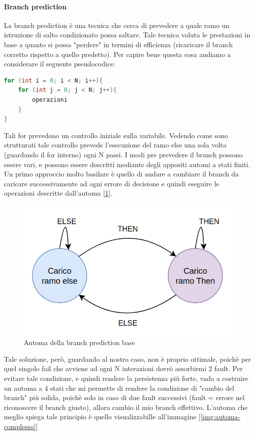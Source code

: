 \paragraph{Branch prediction}
La branch prediction è una tecnica che cerca di prevedere a quale ramo un istruzione di salto condizionato possa saltare. Tale tecnica valuta le prestazioni in base a quanto si possa "perdere" in termini di efficienza (ricaricare il branch corretto rispetto a quello predetto).
Per capire bene questa cosa andiamo a considerare il seguente pseudocodice:
\begin{lstlisting}[language=C]
for (int i = 0; i < N; i++){
    for (int j = 0; j < N; j++){
        operazioni
    }
}
\end{lstlisting}

Tali for prevedono un controllo iniziale sulla variabile. Vedendo come sono strutturati tale controllo prevede l'esecuzione del ramo else una sola volta (guardando il for interno) ogni N passi.
I modi pre prevedere il branch possono essere vari, e possono essere descritti mediante degli appositi automi a stati finiti. Un primo approccio molto basilare è quello di andare a cambiare il branch da caricare successivamente ad ogni errore di decisione e quindi eseguire le operazioni descritte dall'automa [\ref{img:automa-semplice}].

\begin{figure}[ht]
    \centering
    \includegraphics[width=.5\textwidth]{img/automa-semplice.png}
    \caption{Automa della branch prediction base}\label{img:automa-semplice}
\end{figure}

Tale soluzione, però, guardando al nostro caso, non è proprio ottimale, poichè per quel singolo fail che avviene ad ogni N interazioni dovrò assorbirmi 2 fault. Per evitare tale condizione, e quindi rendere la persistenza più forte, vado a costruire un automa a 4 stati che mi permette di rendere la condizione di "cambio del branch" più solida, poichè solo in caso di due fault successivi (fault = errore nel riconoscere il branch giusto), allora cambio il mio branch effettivo. L'automa che meglio spiega tale principio è quello visualizzabille all'immagine [\ref{img:automa-complesso}]

